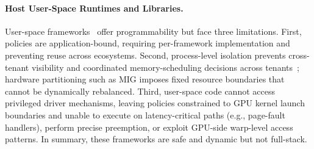 \paragraph{Host User-Space Runtimes and Libraries.}
User-space frameworks~\cite{ng2023paella,gim2025pie,shen2025xsched,chen2025ktransformers,coppock2025lithos} offer programmability but face three limitations.
First, policies are application-bound, requiring per-framework implementation and preventing reuse across ecosystems.
Second, process-level isolation prevents cross-tenant visibility and coordinated memory-scheduling decisions across tenants~\cite{xiao2018gandiva,yu2020fine}; hardware partitioning such as MIG imposes fixed resource boundaries that cannot be dynamically rebalanced.
Third, user-space code cannot access privileged driver mechanisms, leaving policies constrained to GPU kernel launch boundaries and unable to execute on latency-critical paths (e.g., page-fault handlers), perform precise preemption, or exploit GPU-side warp-level access patterns.
In summary, these frameworks are safe and dynamic but not full-stack.

